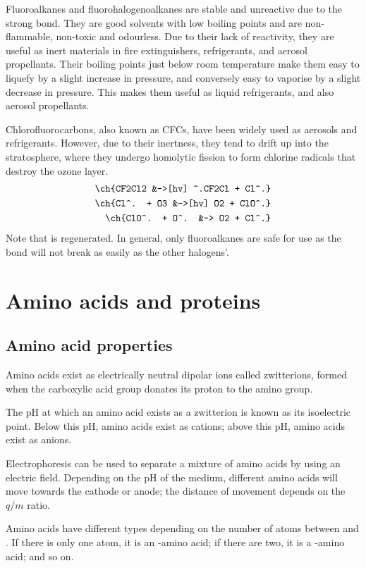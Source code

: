 \documentclass[Chemistry.tex]{subfiles}
\begin{document}
Fluoroalkanes and fluorohalogenoalkanes are stable and unreactive due to the strong  bond. They are good solvents with low boiling points and are non-flammable, non-toxic and odourless. Due to their lack of reactivity, they are useful as inert materials in fire extinguishers, refrigerants, and aerosol propellants. Their boiling points just below room temperature make them easy to liquefy by a slight increase in pressure, and conversely easy to vaporise by a slight decrease in pressure. This makes them useful as liquid refrigerants, and also aerosol propellants.

Chlorofluorocarbons, also known as CFCs, have been widely used as aerosols and refrigerants. However, due to their inertness, they tend to drift up into the stratosphere, where they undergo homolytic fission to form chlorine radicals that destroy the ozone layer. \begin{equation}\begin{split}\ch{CF2Cl2 &->[hv] ^.CF2Cl + Cl^.}\\\ch{Cl^. + O3 &->[hv] O2 + ClO^.}\\\ch{ClO^. + O^. &-> O2 + Cl^.}\end{split}\end{equation} Note that  is regenerated. In general, only fluoroalkanes are safe for use as the  bond will not break as easily as the other halogens'.
\section{Amino acids and proteins}
\subsection{Amino acid properties}
Amino acids exist as electrically neutral dipolar ions called zwitterions, formed when the carboxylic acid group donates its proton to the amino group.

The pH at which an amino acid exists as a zwitterion is known as its isoelectric point. Below this pH, amino acids exist as cations; above this pH, amino acids exist as anions.

Electrophoresis can be used to separate a mixture of amino acids by using an electric field. Depending on the pH of the medium, different amino acids will move towards the cathode or anode; the distance of movement depends on the \(q/m\) ratio.

Amino acids have different types depending on the number of  atoms between  and . If there is only one  atom, it is an \mupalpha-amino acid; if there are two, it is a \mupbeta-amino acid; and so on.
\end{document}
